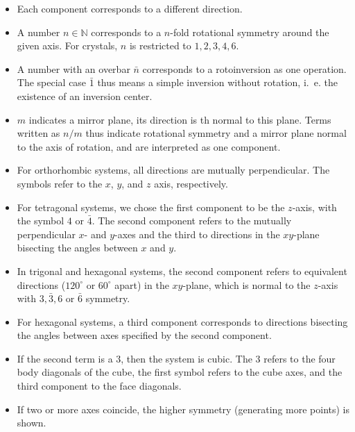 \begin{itemize}
    \item
    Each component corresponds to a different direction. 
    \item
    A number $n \in \mathbb{N}$ corresponds to a $n$-fold rotational symmetry 
    around the given axis. For crystals, $n$ is restricted to $1, 2, 3, 4, 6$.
    \item
    A number with an overbar $\bar{n}$ corresponds 
    to a rotoinversion as one operation. The special case $\bar{1}$ thus 
    means a simple inversion without rotation, i.~e. the existence of 
    an inversion center. 
    \item
    $m$ indicates a mirror plane, its direction is th normal to this plane.
    Terms written as $n/m$ thus indicate rotational symmetry and a mirror plane 
    normal to the axis of rotation, and are interpreted as one component. 
    \item
    For orthorhombic systems, all directions are mutually perpendicular. 
    The symbols refer to the $x$, $y$, and $z$ axis, respectively.
    \item
    For tetragonal systems, we chose the first component to be the $z$-axis, 
    with the symbol $4$ or $\bar{4}$. The second component refers to the 
    mutually perpendicular $x$- and $y$-axes and the third to directions in the 
    $xy$-plane bisecting the angles between $x$ and $y$. 
    \item
    In trigonal and hexagonal systems, the second component refers to 
    equivalent directions ($120^\circ$ or $60^\circ$ apart) in the $xy$-plane, 
    which is normal to the $z$-axis with $3, \bar{3}, 6$ or $\bar{6}$ symmetry. 
    \item
    For hexagonal systems, a third component corresponds to directions bisecting 
    the angles between axes specified by the second component. 
    \item
    If the second term is a $3$, then the system is cubic. The $3$ refers to the 
    four body diagonals of the cube, the first symbol refers to the cube axes, and the 
    third component to the face diagonals.
    \item
    If two or more axes coincide, the higher symmetry (generating more points) is 
    shown. 
\end{itemize}

